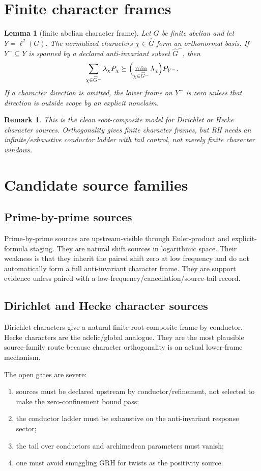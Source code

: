 \documentclass[11pt]{article}
\newtheorem{lemma}{Lemma}
\newtheorem{remark}{Remark}
\begin{document}
\section{Finite character frames}
\begin{lemma}[finite abelian character frame]
Let \(G\) be finite abelian and let \(Y=\ell^2(G)\).  The normalized characters \(\chi\in\widehat G\) form an orthonormal basis.  If \(Y^-\subseteq Y\) is spanned by a declared anti-invariant subset \(\widehat G^-\), then
\[
\sum_{\chi\in\widehat G^-}\lambda_\chi P_\chi\succeq \Bigl(\min_{\chi\in\widehat G^-}\lambda_\chi\Bigr)P_{Y^-}.
\]
If a character direction is omitted, the lower frame on \(Y^-\) is zero unless that direction is outside scope by an explicit nonclaim.
\end{lemma}

\begin{remark}
This is the clean root-composite model for Dirichlet or Hecke character sources.  Orthogonality gives finite character frames, but RH needs an infinite/exhaustive conductor ladder with tail control, not merely finite character windows.
\end{remark}

\section{Candidate source families}
\subsection{Prime-by-prime sources}
Prime-by-prime sources are upstream-visible through Euler-product and explicit-formula staging.  They are natural shift sources in logarithmic space.  Their weakness is that they inherit the paired shift zero at low frequency and do not automatically form a full anti-invariant character frame.  They are support evidence unless paired with a low-frequency/cancellation/source-tail record.

\subsection{Dirichlet and Hecke character sources}
Dirichlet characters give a natural finite root-composite frame by conductor.  Hecke characters are the adelic/global analogue.  They are the most plausible source-family route because character orthogonality is an actual lower-frame mechanism.

The open gates are severe:
\begin{enumerate}[label=(\roman*)]
\item sources must be declared upstream by conductor/refinement, not selected to make the zero-confinement bound pass;
\item the conductor ladder must be exhaustive on the anti-invariant response sector;
\item the tail over conductors and archimedean parameters must vanish;
\item one must avoid smuggling GRH for twists as the positivity source.
\end{enumerate}
\end{document}
